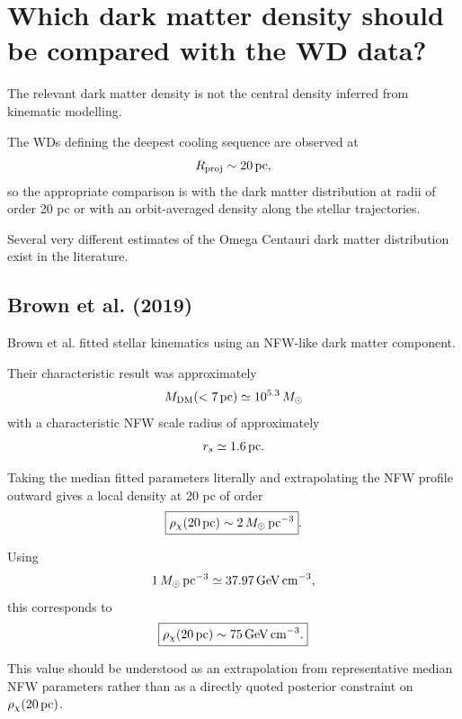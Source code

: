 \documentclass[11pt,a4paper]{article}
\begin{document}
\section{Which dark matter density should be compared with the WD data?}
\label{sec:whichrho}

The relevant dark matter density is not the central density inferred from kinematic modelling.

The WDs defining the deepest cooling sequence are observed at
\begin{equation}
R_{\rm proj}\sim20\,{\rm pc},
\end{equation}
so the appropriate comparison is with the dark matter distribution at radii of order 20 pc or with an orbit-averaged density along the stellar trajectories.

Several very different estimates of the Omega Centauri dark matter distribution exist in the literature.


\subsection{Brown et al. (2019)}

Brown et al. fitted stellar kinematics using an NFW-like dark matter component.

Their characteristic result was approximately
\begin{equation}
M_{\rm DM}(<7\,{\rm pc})
\simeq10^{5.3}\,M_\odot
\end{equation}
with a characteristic NFW scale radius of approximately
\begin{equation}
r_s\simeq1.6\,{\rm pc}.
\end{equation}

Taking the median fitted parameters literally and extrapolating the NFW profile outward gives a local density at 20 pc of order
\begin{equation}
\boxed{
\rho_\chi(20\,{\rm pc})
\sim2\,M_\odot\,{\rm pc}^{-3}
}.
\end{equation}

Using
\begin{equation}
1\,M_\odot\,{\rm pc}^{-3}
\simeq37.97\,{\rm GeV\,cm^{-3}},
\end{equation}
this corresponds to
\begin{equation}
\boxed{
\rho_\chi(20\,{\rm pc})
\sim75\,{\rm GeV\,cm^{-3}}.
}
\end{equation}

This value should be understood as an extrapolation from representative median NFW parameters rather than as a directly quoted posterior constraint on $\rho_\chi(20\,{\rm pc})$.
\end{document}
